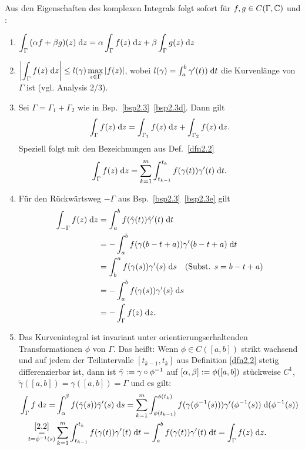 \documentclass[a4paper,twoside,DIV15,BCOR12mm]{scrbook}
\begin{document}
\begin{bem}
Aus den Eigenschaften des komplexen Integrals folgt sofort für $f,g\in C(\Gamma,\mathbb{C})$ und \kmplx{\alpha,\beta}:
\begin{enumerate}
\item $\displaystyle \int_{\Gamma}^{}{(\alpha f + \beta g)(z)}\;\mathrm{d}z = \alpha \int_{\Gamma}^{}{f(z)}\;\mathrm{d}z + \beta \int_{\Gamma}^{}{g(z)}\;\mathrm{d}z$
\item $\displaystyle \left\lvert\int_{\Gamma}^{}{f(z)}\;\mathrm{d}z\right\lvert \le l(\gamma) \max_{z\in\Gamma}{\left\lvert f(z)\right\lvert}$, wobei $l(\gamma) = \int_{a}^{b}{\gamma^\prime(t))}\;\mathrm{d}t$ die Kurvenlänge von $\Gamma$ ist (vgl. Analysis 2/3).
\item Sei $\Gamma=\Gamma_1+\Gamma_2$ wie in Bsp.~\ref{bsp2.3}~\ref{bsp2.3d}. Dann gilt \[\int_{\Gamma}^{}{f(z)}\;\mathrm{d}z = \int_{\Gamma_1}^{}{f(z)}\;\mathrm{d}z + \int_{\Gamma_2}^{}{f(z)}\;\mathrm{d}z.\] Speziell folgt mit den Bezeichnungen aus Def.~\ref{dfn2.2} \[\int_{\Gamma}^{}{f(z)}\;\mathrm{d}z = \sum_{k=1}^m{\int_{t_{k-1}}^{t_k}{f(\gamma(t))\gamma^\prime(t)}\;\mathrm{d}t}.\]
\item Für den Rückwärtsweg $-\Gamma$ aus Bsp.~\ref{bsp2.3}~\ref{bsp2.3e} gilt
\begin{align*}
\int_{-\Gamma}^{}{f(z)}\;\mathrm{d}z &= \int_{a}^{b}{f(\hat{\gamma}(t))\hat{\gamma}^\prime(t)}\;\mathrm{d}t \\
&= -\int_{a}^{b}{f(\gamma(b-t+a))\gamma^\prime(b-t+a)}\;\mathrm{d}t\\
&= \int_{b}^{a}{f(\gamma(s))\gamma^\prime(s)}\;\mathrm{d}s \quad (\text{Subst. } s=b-t+a) \\
&= -\int_{a}^{b}{f(\gamma(s))\gamma^\prime(s)}\;\mathrm{d}s\\
&= - \int_{\Gamma}^{}{f(z)}\;\mathrm{d}z.
\end{align*}

\item Das Kurvenintegral ist invariant unter orientierungserhaltenden Transformationen $\phi$ von $\Gamma$. Das heißt: Wenn $\phi\in C([a,b])$ strikt wachsend und auf jedem der Teilintervalle $[t_{k-1},t_k]$ aus Definition \ref{dfn2.2} stetig differenzierbar ist, dann ist $\tilde{\gamma}:= \gamma\circ\phi^{-1}$ auf $[\alpha,\beta]:=\phi([a,b])$ stückweise $C^1$, $\tilde{\gamma}([a,b]) = \gamma([a,b]) = \Gamma$ und es gilt:
\begin{align*}
\int_{\Gamma}^{}{f}\;\mathrm{d}z=&\int_{\alpha}^{\beta}{f(\tilde{\gamma}(s))\tilde{\gamma}^\prime(s)}\;\mathrm{d}s = \sum_{k=1}^m\int_{\phi(t_{k-1})}^{\phi(t_k)}{f(\gamma(\phi^{-1}(s)))\gamma^\prime(\phi^{-1}(s))}\;\mathrm{d}(\phi^{-1}(s))\\
\underset{t=\phi^{-1}(s)}{\overset{\eqref{2.2}}{=}}& \sum^m_{k=1}\int_{t_{k-1}}^{t_k}{f(\gamma(t))\gamma^\prime(t)}\;\mathrm{d}t = \int_{a}^{b}{f(\gamma(t))\gamma^\prime(t)}\;\mathrm{d}t = \int_{\Gamma}^{}{f(z)}\;\mathrm{d}z.
\end{align*}


\end{enumerate}
\end{bem}
\end{document}
